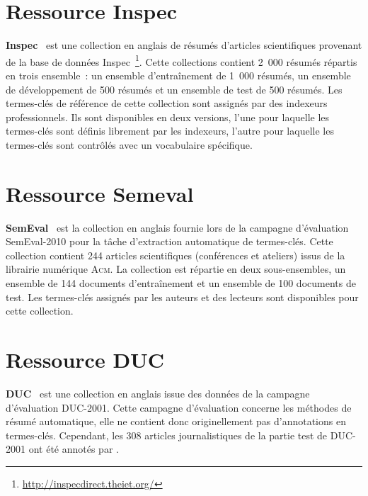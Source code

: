 
  \section{Ressource Inspec}
  \label{sec:main-data_description-inspec_data}
    \textbf{Inspec}~\citep{hulth2003keywordextraction} est une collection en
    anglais de résumés d'articles scientifiques provenant de la base de données
    Inspec~\footnote{\url{http://inspecdirect.theiet.org/}}. Cette collections
    contient 2~000 résumés répartis en trois ensemble~: un ensemble
    d'entraînement de 1~000 résumés, un ensemble de développement de 500 résumés
    et un ensemble de test de 500 résumés. Les termes-clés de référence de cette
    collection sont assignés par des indexeurs professionnels. Ils sont
    disponibles en deux versions, l'une pour laquelle les termes-clés sont
    définis librement par les indexeurs, l'autre pour laquelle les termes-clés
    sont contrôlés avec un vocabulaire spécifique.


  \section{Ressource Semeval}
  \label{sec:main-data_description-semeval_data}
    \textbf{SemEval}~\citep{kim2010semeval} est la collection en anglais fournie
    lors de la campagne d'évaluation SemEval-2010 pour la tâche d'extraction
    automatique de termes-clés. Cette collection contient 244 articles
    scientifiques (conférences et ateliers) issus de la librairie numérique
    \textsc{Acm}. La collection est répartie en deux sous-ensembles, un ensemble
    de 144 documents d'entraînement et un ensemble de 100 documents de test. Les
    termes-clés assignés par les auteurs et des lecteurs sont disponibles pour
    cette collection.


  \section{Ressource DUC}
  \label{sec:main-data_description-duc_data}
    \textbf{DUC}~\citep{over2001duc} est une collection en anglais issue des
    données de la campagne d'évaluation DUC-2001. Cette campagne d'évaluation
    concerne les méthodes de résumé automatique, elle ne contient donc
    originellement pas d'annotations en termes-clés. Cependant, les 308 articles
    journalistiques de la partie test de DUC-2001 ont été annotés par
    \cite{wan2008expandrank}.

